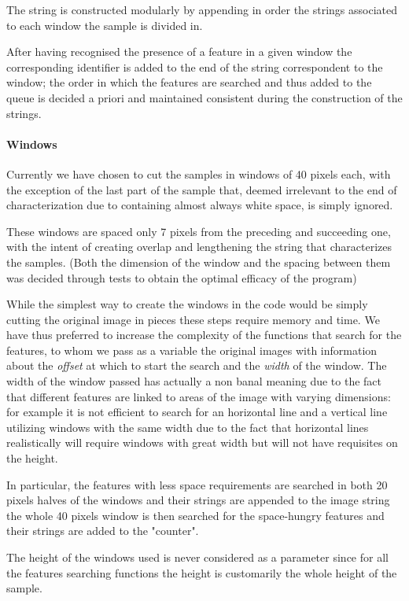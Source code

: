 The string is constructed modularly by appending in order the strings associated to each window the sample is divided in.

After having recognised the presence of a feature in a given window the corresponding identifier is added to the end of the string correspondent to the window; the order in which the features are searched and thus added to the queue is decided a priori and maintained consistent during the construction of the strings. 


\paragraph{Windows}

Currently we have chosen to cut the samples in windows of 40 pixels each, with the exception of the last part of the sample that, deemed irrelevant to the end of characterization due to containing almost always white space, is simply ignored.

These windows are spaced only 7 pixels from the preceding and succeeding one, with the intent of creating overlap and lengthening the string that characterizes the samples.
(Both the dimension of the window and the spacing between them was decided through tests to obtain the optimal efficacy of the program)

While the simplest way to create the windows in the code would be simply cutting the original image in pieces these steps require memory and time. We have thus preferred to increase the complexity of the functions that search for the features, to whom we pass as a variable the original images with information about the \textit{offset} at which to start the search and the \textit{width} of the window. The width of the window passed has actually a non banal meaning due to the fact that different features are linked to areas of the image with varying dimensions: for example it is not efficient to search for an horizontal line and a vertical line utilizing windows with the same width due to the fact that horizontal lines realistically will require windows with great width but will not have requisites on the height.

In particular, the features with less space requirements are searched in both 20 pixels halves of the windows and their strings are appended to the image string the whole 40 pixels window is then searched for the space-hungry features and their strings are added to the "counter". 

The height of the windows used is never considered as a parameter since for all the features searching functions the height is customarily the whole height of the sample.  

